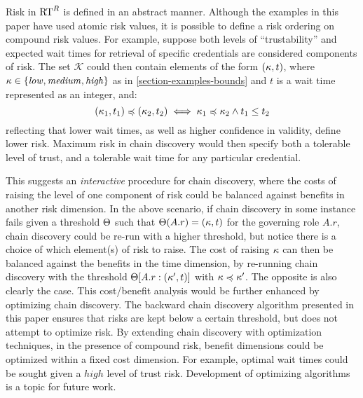 Risk in $\text{RT}^R$ is defined in an abstract manner.  Although the
examples in this paper have used atomic risk values, it is possible to
define a risk ordering on compound risk values.  For example, suppose
both levels of ``trustability'' and expected wait times for retrieval
of specific credentials are considered components of risk.  The set
$\mathcal{K}$ could then contain elements of the form $(\kappa,t)$,
where $\kappa \in \left\{\mathit{low,medium,high}\right\}$ as in
\autoref{section-examples-bounds} and $t$ is a wait time represented as an
integer, and:
$$
(\kappa_1,t_1) \preccurlyeq (\kappa_2,t_2) \iff \kappa_1 \preccurlyeq \kappa_2 \wedge
t_1 \le t_2
$$ 
reflecting that lower wait times, as well as higher confidence in
validity, define lower risk.  Maximum risk in chain discovery would
then specify both a tolerable level of trust, and a tolerable wait
time for any particular credential.

This suggests an \emph{interactive} procedure for chain discovery,
where the costs of raising the level of one component of risk could be
balanced against benefits in another risk dimension.  In the above
scenario, if chain discovery in some instance fails given a threshold
$\Theta$ such that $\Theta(A.r) = (\kappa, t)$ for the governing role
$A.r$, chain discovery could be re-run with a higher threshold, but
notice there is a choice of which element(s) of risk to raise.  The
cost of raising $\kappa$ can then be balanced against the benefits in
the time dimension, by re-running chain discovery with the threshold
$\Theta[A.r : (\kappa',t)]$  with $\kappa\preccurlyeq\kappa'$.
The opposite is also clearly the case.  This cost/benefit analysis
would be further enhanced by optimizing chain discovery.  The backward
chain discovery algorithm presented in this paper ensures that risks
are kept below a certain threshold, but does not attempt to optimize
risk.  By extending chain discovery with optimization techniques, in
the presence of compound risk, benefit dimensions could be optimized
within a fixed cost dimension.  For example, optimal wait times could
be sought given a $\mathit{high}$ level of trust risk.  Development of
optimizing algorithms is a topic for future work.
